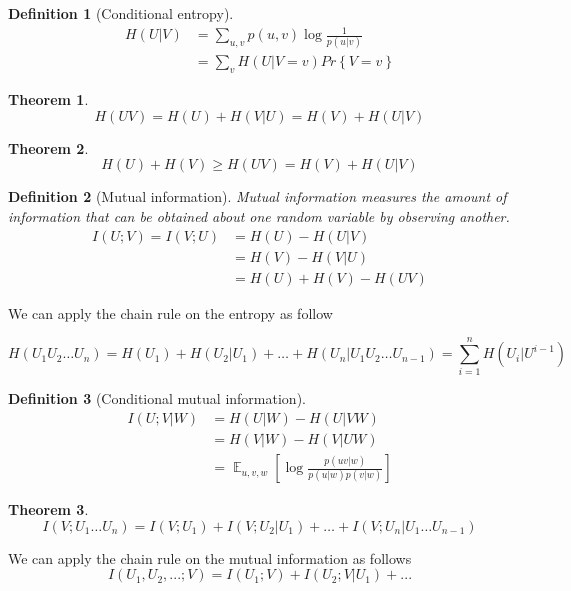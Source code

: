 \documentclass{article}
\newtheorem{theorem}{Theorem}[section]
\newtheorem{definition}{Definition}[section]
\theoremstyle{definition} %
\renewcommand{\Pr}[1]{Pr\left\{#1\right\}}
\DeclareMathOperator{\E}{\mathbb{E}}%
\begin{document}
\begin{definition}[Conditional entropy]
  \begin{align*}
    H(U|V) &= \sum_{u,v} p(u,v) \log \frac 1 {p(u|v)}\\
           &= \sum_v H(U | V = v) \Pr{V = v}
  \end{align*}
\end{definition}

\begin{theorem}
  \[
    H(UV) = H(U) + H(V|U) = H(V) + H(U|V)
  \]
\end{theorem}

\begin{theorem}
  \[
    H(U) + H(V) \geq H(UV) = H(V) + H(U|V)
  \]
\end{theorem}

\begin{definition}[Mutual information]
  Mutual information measures the amount of information that can be obtained about one random variable by observing another.
  \begin{align*}
  I(U;V) = I(V;U) &= H(U) - H(U|V)\\
  &= H(V) - H(V|U)\\
  &= H(U) + H(V) - H(UV)
  \end{align*}
\end{definition}

We can apply the chain rule on the entropy as follow

\[
  H(U_1 U_2 \dots U_n) = H(U_1) + H(U_2|U_1) + \dots + H(U_n|U_1 U_2 \dots U_{n-1})
  = \sum_{i = 1}^n H(U_i | U^{i-1})
\]

\begin{definition}[Conditional mutual information]
  \begin{align*}
    I(U;V|W) &= H(U|W) - H(U|VW)\\
    &= H(V|W) - H(V|UW)\\
    &= \E_{u,v,w} \left[ \log \frac {p(uv|w)} {p(u|w)p(v|w)} \right]
  \end{align*}
\end{definition}

\begin{theorem}
  \[
    I(V;U_1\dots U_n) = I(V;U_1) + I(V;U_2 | U_1) + \dots + I(V;U_n|U_1 \dots U_{n-1})
  \]
\end{theorem}

We can apply the chain rule on the mutual information as follows
\[
  I(U_1, U_2, ... ; V) = I(U_1; V) + I(U_2; V | U_1) + ...
\]
\end{document}
